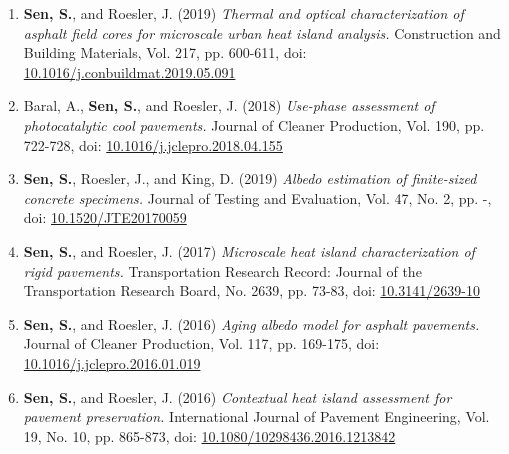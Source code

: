 \documentclass[12pt]{article}
\begin{document}
\begin{enumerate}[label=(J\arabic*)]
		\item \textbf{Sen, S.}, and Roesler, J. (2019) \textit{Thermal and optical characterization of asphalt field cores for microscale urban heat island analysis.}  Construction and Building Materials, Vol. 217, pp. 600-611, doi: \href{https://doi.org/10.1016/j.conbuildmat.2019.05.091}{10.1016/j.conbuildmat.2019.05.091}
	\item Baral, A., \textbf{Sen, S.}, and Roesler, J. (2018) \textit{Use-phase assessment of photocatalytic cool pavements.}  Journal of Cleaner Production, Vol. 190, pp. 722-728, doi: \href{https://doi.org/10.1016/j.jclepro.2018.04.155}{10.1016/j.jclepro.2018.04.155}
	\item \textbf{Sen, S.}, Roesler, J., and King, D. (2019) \textit{Albedo estimation of finite-sized concrete specimens.} Journal of Testing and Evaluation, Vol. 47, No. 2, pp. -, doi: \href{https://doi.org/10.1520/JTE20170059}{10.1520/JTE20170059}
	\item \textbf{Sen, S.}, and Roesler, J. (2017) \textit{Microscale heat island characterization of rigid pavements.} Transportation Research Record: Journal of the Transportation Research Board, No. 2639, pp. 73-83, doi: \href{http://dx.doi.org/10.3141/2639-10}{10.3141/2639-10}
	\item \textbf{Sen, S.}, and Roesler, J. (2016) \textit{Aging albedo model for asphalt pavements.} Journal of Cleaner Production, Vol. 117, pp. 169-175, doi: \href{http://dx.doi.org/10.1016/j.jclepro.2016.01.019}{10.1016/j.jclepro.2016.01.019}
	\item \textbf{Sen, S.}, and Roesler, J. (2016) \textit{Contextual heat island assessment for pavement preservation.} International Journal of Pavement Engineering, Vol. 19, No. 10, pp. 865-873, doi: \href{https://www.tandfonline.com/doi/full/10.1080/10298436.2016.1213842}{10.1080/10298436.2016.1213842}
\end{enumerate} 

\hfill
\end{document}
